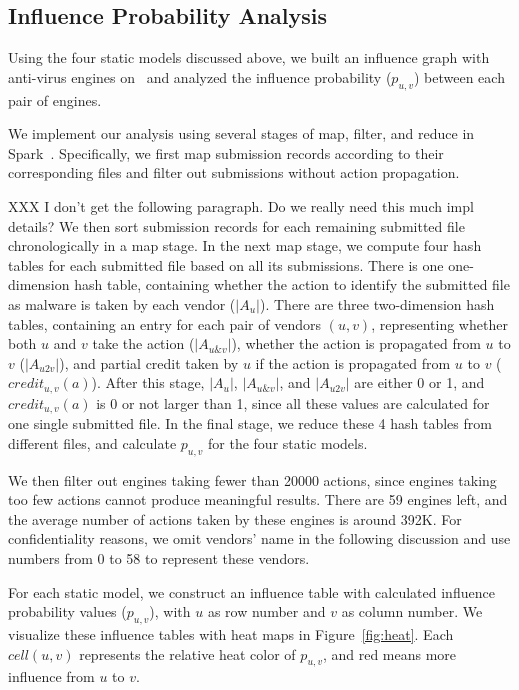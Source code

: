 


\subsection{Influence Probability Analysis}
\label{sec:influenceanalysis}

Using the four static models discussed above, we built an influence graph with anti-virus engines on \vt\ and analyzed 
the influence probability ($p_{u,v}$) between each pair of engines.

We implement our analysis using several stages of map, filter, and reduce in Spark~\cite{spark}. 
Specifically, we first map submission records according to their corresponding files
and filter out submissions without action propagation. 

{\color{red} XXX I don't get the following paragraph. Do we really need this much impl details?}
We then sort submission records for each remaining submitted file chronologically in a map stage.
In the next map stage, we compute four hash tables for each submitted file based on all its submissions.   
There is one one-dimension hash table, containing whether the action to identify the submitted file as malware is taken by each vendor ($|A_{u}|$). 
There are three two-dimension hash tables, 
containing an entry for each pair of vendors $(u,v)$, 
representing whether both $u$ and $v$ take the action ($|A_{u\&v}|$),  
whether the action is propagated from $u$ to $v$ ($|A_{u2v}|$),
and partial credit taken by $u$ if the action is propagated from $u$ to $v$ ($credit_{u,v}(a)$).
After this stage, $|A_{u}|$, $|A_{u\&v}|$, and $|A_{u2v}|$ are either 0 or 1,
and $credit_{u,v}(a)$ is 0 or not larger than 1, since all these values are calculated for one single submitted file. 
In the final stage, 
we reduce these 4 hash tables from different files,
and calculate $p_{u,v}$ for the four static models. 
\fi

We then filter out engines taking fewer than 20000 actions,
since engines taking too few actions cannot produce meaningful results.
There are 59 engines left,
and the average number of actions taken by these engines is around 392K. %
For confidentiality reasons, we omit vendors' name in the following discussion
and use numbers from 0 to 58 to represent these vendors.

For each static model, 
we construct an influence table with calculated influence probability values ($p_{u,v}$), 
with $u$ as row number and $v$ as column number.
We visualize these influence tables with heat maps in Figure~\ref{fig:heat}. 
Each $cell(u, v)$ represents the relative heat color of $p_{u,v}$, 
and red means more influence from $u$ to $v$. 

